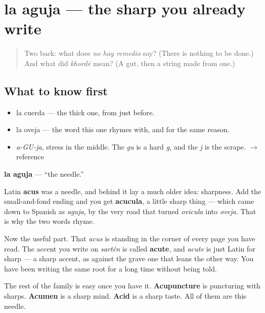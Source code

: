 \section[la aguja]{la aguja — the sharp you already write}

\label{lesson:ES-C301-aguja}



\begin{quote}
Two back: what does \emph{no hay remedio} say? (There is nothing to be done.) And what did \emph{khordē} mean? (A gut, then a string made from one.)
\end{quote}

\subsection*{What to know first}
\begin{itemize}
\raggedright
  \item la cuerda — the thick one, from just before.
  \item la oveja — the word this one rhymes with, and for the same reason.
\end{itemize}

\begin{sounds}
\begin{itemize}
\raggedright
  \item \emph{a-GU-ja}, stress in the middle. The \emph{gu} is a hard \emph{g}, and the \emph{j} is the scrape. $\to$ reference
\end{itemize}
\end{sounds}

\begin{cousinweb}
\textbf{la aguja} — \textquotedblleft{}the needle.\textquotedblright{}

Latin \textbf{acus} was a needle, and behind it lay a much older idea: sharpness. Add the small-and-fond ending and you get \textbf{acucula}, a little sharp thing — which came down to Spanish as \emph{aguja}, by the very road that turned \emph{ovicula} into \emph{oveja}. That is why the two words rhyme.

Now the useful part. That \emph{acus} is standing in the corner of every page you have read. The accent you write on \emph{sartén} is called \textbf{acute}, and \emph{acute} is just Latin for sharp — a sharp accent, as against the grave one that leans the other way. You have been writing the same root for a long time without being told.

The rest of the family is easy once you have it. \textbf{Acupuncture} is puncturing with sharps. \textbf{Acumen} is a sharp mind. \textbf{Acid} is a sharp taste. All of them are this needle.
\end{cousinweb}


